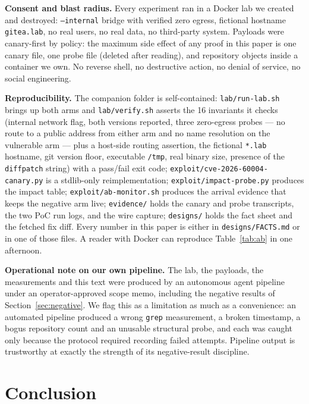 \textbf{Consent and blast radius.} Every experiment ran in a Docker lab we
created and destroyed: \texttt{--internal} bridge with verified zero egress,
fictional hostname \texttt{gitea.lab}, no real users, no real data, no
third-party system. Payloads were canary-first by policy: the maximum side
effect of any proof in this paper is one canary file, one probe file (deleted
after reading), and repository objects inside a container we own. No reverse
shell, no destructive action, no denial of service, no social engineering.

\textbf{Reproducibility.} The companion folder is self-contained:
\texttt{lab/run-lab.sh} brings up both arms and \texttt{lab/verify.sh} asserts
the 16 invariants it checks (internal network flag, both versions reported,
three zero-egress probes --- no route to a public address from either arm and no
name resolution on the vulnerable arm --- plus a host-side routing assertion, the
fictional \texttt{*.lab} hostname, git version floor, executable \texttt{/tmp},
real binary size, presence of the \texttt{diffpatch} string) with a pass/fail
exit code;
\texttt{exploit/cve-2026-60004-canary.py} is a stdlib-only reimplementation;
\texttt{exploit/impact-probe.py} produces the impact table;
\texttt{exploit/ab-monitor.sh} produces the arrival evidence that keeps the
negative arm live; \texttt{evidence/} holds the canary and probe transcripts,
the two PoC run logs, and the wire capture; \texttt{designs/} holds the fact
sheet and the fetched fix diff. Every number in this paper is either in
\texttt{designs/FACTS.md} or in one of those files. A reader with Docker can
reproduce Table~\ref{tab:ab} in one afternoon.

\textbf{Operational note on our own pipeline.} The lab, the payloads, the
measurements and this text were produced by an autonomous agent pipeline under
an operator-approved scope memo, including the negative results of
Section~\ref{sec:negative}. We flag this as a limitation as much as a
convenience: an automated pipeline produced a wrong \texttt{grep} measurement,
a broken timestamp, a bogus repository count and an unusable structural probe,
and each was caught only because the protocol required recording failed
attempts. Pipeline output is trustworthy at exactly the strength of its
negative-result discipline.

\section{Conclusion}
\label{sec:conclusion}

